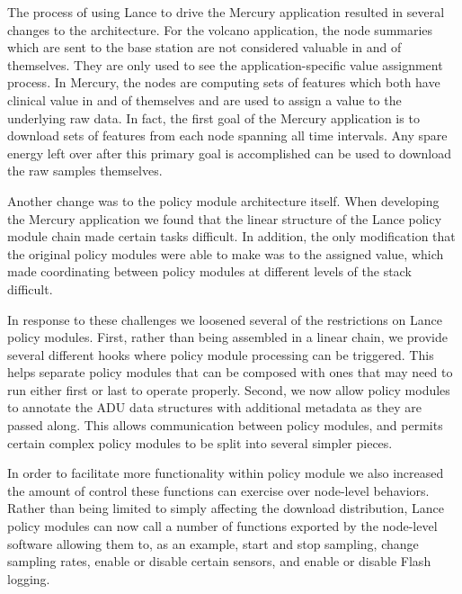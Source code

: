The process of using Lance to drive the Mercury application resulted in
several changes to the architecture. For the volcano application, the node
summaries which are sent to the base station are not considered valuable in
and of themselves. They are only used to see the application-specific value
assignment process. In Mercury, the nodes are computing sets of features
which both have clinical value in and of themselves and are used to assign a
value to the underlying raw data. In fact, the first goal of the Mercury
application is to download sets of features from each node spanning all time
intervals. Any spare energy left over after this primary goal is accomplished
can be used to download the raw samples themselves.

Another change was to the policy module architecture itself. When developing
the Mercury application we found that the linear structure of the Lance
policy module chain made certain tasks difficult. In addition, the only
modification that the original policy modules were able to make was to the
assigned value, which made coordinating between policy modules at different
levels of the stack difficult.

In response to these challenges we loosened several of the restrictions on
Lance policy modules. First, rather than being assembled in a linear chain,
we provide several different hooks where policy module processing can be
triggered. This helps separate policy modules that can be composed with ones
that may need to run either first or last to operate properly. Second, we now
allow policy modules to annotate the ADU data structures with additional
metadata as they are passed along. This allows communication between policy
modules, and permits certain complex policy modules to be split into several
simpler pieces.

In order to facilitate more functionality within policy module we also
increased the amount of control these functions can exercise over node-level
behaviors. Rather than being limited to simply affecting the download
distribution, Lance policy modules can now call a number of functions
exported by the node-level software allowing them to, as an example, start
and stop sampling, change sampling rates, enable or disable certain sensors,
and enable or disable Flash logging.

